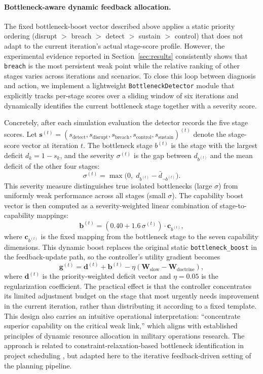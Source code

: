 \paragraph{Bottleneck-aware dynamic feedback allocation.}
The fixed bottleneck-boost vector described above applies a static priority ordering (disrupt $>$ breach $>$ detect $>$ sustain $>$ control) that does not adapt to the current iteration's actual stage-score profile. However, the experimental evidence reported in Section~\ref{sec:results} consistently shows that \texttt{breach} is the most persistent weak point while the relative ranking of other stages varies across iterations and scenarios. To close this loop between diagnosis and action, we implement a lightweight \texttt{BottleneckDetector} module that explicitly tracks per-stage scores over a sliding window of six iterations and dynamically identifies the current bottleneck stage together with a severity score.

Concretely, after each simulation evaluation the detector records the five stage scores. Let $\mathbf{s}^{(t)} = (s_{\text{detect}}, s_{\text{disrupt}}, s_{\text{breach}}, s_{\text{control}}, s_{\text{sustain}})^{(t)}$ denote the stage-score vector at iteration $t$. The bottleneck stage $b^{(t)}$ is the stage with the largest deficit $d_k = 1 - s_k$, and the severity $\sigma^{(t)}$ is the gap between $d_{b^{(t)}}$ and the mean deficit of the other four stages:
\[
\sigma^{(t)} = \max\!\bigl(0,\; d_{b^{(t)}} - \bar{d}_{\neg b^{(t)}}\bigr).
\]
This severity measure distinguishes true isolated bottlenecks (large $\sigma$) from uniformly weak performance across all stages (small $\sigma$). The capability boost vector is then computed as a severity-weighted linear combination of stage-to-capability mappings:
\[
\mathbf{b}^{(t)} = (0.40 + 1.6\,\sigma^{(t)}) \cdot \mathbf{c}_{b^{(t)}},
\]
where $\mathbf{c}_{b^{(t)}}$ is the fixed mapping from the bottleneck stage to the seven capability dimensions. This dynamic boost replaces the original static \texttt{bottleneck\_boost} in the feedback-update path, so the controller's utility gradient becomes
\[
\mathbf{g}^{(t)} = \mathbf{d}^{(t)} + \mathbf{b}^{(t)} - \eta(\mathbf{W}_{\text{slow}} - \mathbf{W}_{\text{doctrine}}),
\]
where $\mathbf{d}^{(t)}$ is the priority-weighted deficit vector and $\eta=0.05$ is the regularization coefficient. The practical effect is that the controller concentrates its limited adjustment budget on the stage that most urgently needs improvement in the current iteration, rather than distributing it according to a fixed template. This design also carries an intuitive operational interpretation: ``concentrate superior capability on the critical weak link,'' which aligns with established principles of dynamic resource allocation in military operations research. The approach is related to constraint-relaxation-based bottleneck identification in project scheduling \citep{nedbalek2025bottleneck}, but adapted here to the iterative feedback-driven setting of the planning pipeline.

